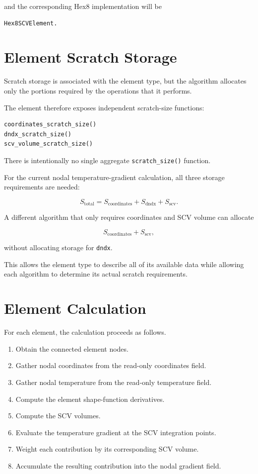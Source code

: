 \documentclass[11pt]{article}
\begin{document}
and the corresponding Hex8 implementation will be

\begin{verbatim}
Hex8SCVElement.
\end{verbatim}

\section{Element Scratch Storage}

Scratch storage is associated with the element type, but the
algorithm allocates only the portions required by the operations
that it performs.

The element therefore exposes independent scratch-size functions:

\begin{verbatim}
coordinates_scratch_size()
dndx_scratch_size()
scv_volume_scratch_size()
\end{verbatim}

There is intentionally no single aggregate
\texttt{scratch\_size()} function.

For the current nodal temperature-gradient calculation, all three
storage requirements are needed:

$$
S_{\mathrm{total}}
=
S_{\mathrm{coordinates}}
+
S_{\mathrm{dndx}}
+
S_{\mathrm{scv}}.
$$

A different algorithm that only requires coordinates and SCV volume
can allocate

$$
S_{\mathrm{coordinates}}
+
S_{\mathrm{scv}},
$$

without allocating storage for \texttt{dndx}.

This allows the element type to describe all of its available data
while allowing each algorithm to determine its actual scratch
requirements.

\section{Element Calculation}

For each element, the calculation proceeds as follows.

\begin{enumerate}
\item Obtain the connected element nodes.
\item Gather nodal coordinates from the read-only coordinates
field.
\item Gather nodal temperature from the read-only temperature
field.
\item Compute the element shape-function derivatives.
\item Compute the SCV volumes.
\item Evaluate the temperature gradient at the SCV integration
points.
\item Weight each contribution by its corresponding SCV volume.
\item Accumulate the resulting contribution into the nodal
gradient field.
\end{enumerate}
\end{document}

